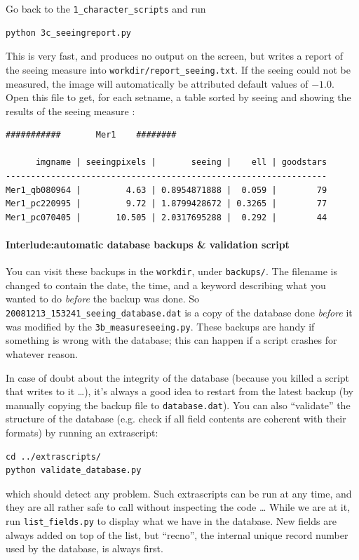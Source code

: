 Go back to the \verb+1_character_scripts+ and run
\begin{Verbatim}
python 3c_seeingreport.py 
\end{Verbatim}

This is very fast, and produces no output on the screen, but writes a report of the seeing measure into \verb+workdir/report_seeing.txt+. If the seeing could not be measured, the image will automatically be attributed default values of $-1.0$.
Open this file to get, for each setname, a table sorted by seeing and showing the results of the seeing measure :

\begin{Verbatim}[fontsize=\relsize{-2}]
      ###########       Mer1    ########

      imgname | seeingpixels |       seeing |    ell | goodstars
----------------------------------------------------------------
Mer1_qb080964 |         4.63 | 0.8954871888 |  0.059 |        79
Mer1_pc220995 |         9.72 | 1.8799428672 | 0.3265 |        77
Mer1_pc070405 |       10.505 | 2.0317695288 |  0.292 |        44
\end{Verbatim}


\paragraph{Interlude:automatic database backups \& validation script}

You can visit these backups in the \verb+workdir+, under \verb+backups/+. The filename is changed to contain the date, the time, and a keyword describing what you wanted to do \emph{before} the backup was done. So \verb+20081213_153241_seeing_database.dat+ is a copy of the database done \emph{before} it was modified by the \verb+3b_measureseeing.py+.
These backups are handy if something is wrong with the database; this can happen if a script crashes for whatever reason.

In case of doubt about the integrity of the database (because you killed a script that writes to it \ldots), it's always a good idea to restart from the latest backup (by manually copying the backup file to \verb+database.dat+). You can also ``validate'' the structure of the database (e.g. check if all field contents are coherent with their formats) by running an extrascript:

\begin{Verbatim}
cd ../extrascripts/
python validate_database.py
\end{Verbatim}
which should detect any problem. Such extrascripts can be run at any time, and they are all rather safe to call without inspecting the code \ldots
While we are at it, run \verb+list_fields.py+ to display what we have in the database. New fields are always added on top of the list, but ``recno'', the internal unique record number used by the database, is always first.

